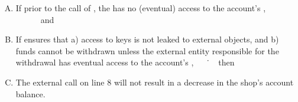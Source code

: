 \vspace{.05cm}
\begin{enumerate}[(A)]
\item   If prior to the call of  , the   has no (eventual) access to the account's \password, \ \ \ \  \ \  and
\item  If \Mshop ensures that a) access to keys is not leaked to external objects, 
and b) funds cannot be withdrawn unless the external entity responsible for the withdrawal has eventual access to the account's \password,\ \ \ \.  \ \ \  then 
\item  The external  call on line 8 will not result  in a decrease in the shop's account balance.
\end{enumerate}

